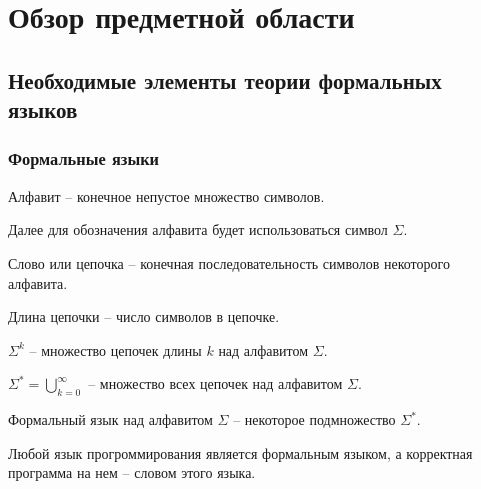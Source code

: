 \chapter{Обзор предметной области}
\section{Необходимые элементы теории формальных языков}
\subsection{Формальные языки}
\begin{definition}
Алфавит -- конечное непустое множество символов.
\end{definition}
Далее для обозначения алфавита будет использоваться символ $\Sigma$.
\begin{definition}
Слово или цепочка -- конечная последовательность символов некоторого алфавита.
\end{definition}
\begin{definition}
Длина цепочки -- число символов в цепочке.
\end{definition}
\begin{definition}
$\Sigma^k$ -- множество цепочек длины $k$ над алфавитом $\Sigma$.
\end{definition}
\begin{definition}
$\Sigma^* = \bigcup\limits_{k=0}^\infty$ -- множество всех цепочек над алфавитом $\Sigma$.
\end{definition}
\begin{definition}
Формальный язык над алфавитом $\Sigma$ -- некоторое подмножество $\Sigma^*$.
\end{definition}
Любой язык прогроммирования является формальным языком, а корректная программа на нем -- словом этого языка.
